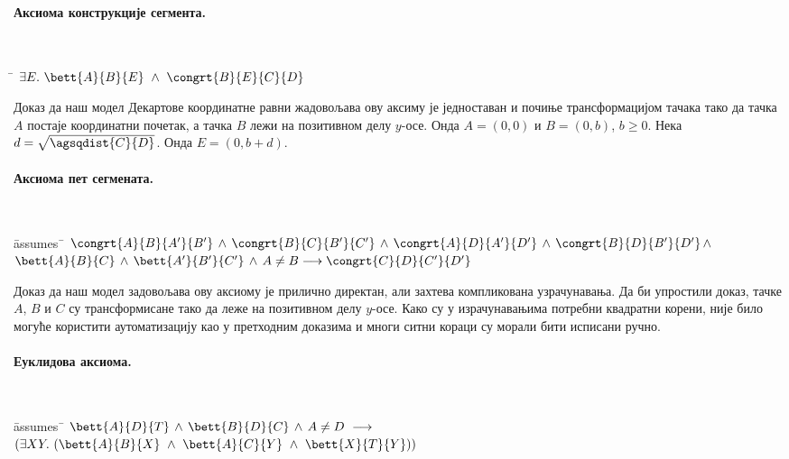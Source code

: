 \begin{center}

\end{center}


\paragraph{Аксиома конструкције сегмента.}
{\tt
\begin{tabbing}
\hspace{5mm}\=\kill
$\exists E.\ \bett{A}{B}{E}\ \wedge\ \congrt{B}{E}{C}{D}$
\end{tabbing}
}

Доказ да наш модел Декартове координатне равни жадовољава ову аксиму
је једноставан и почиње трансформацијом тачака тако да тачка $A$
постаје координатни почетак, а тачка $B$ лежи на позитивном делу
$y$-осе. Онда $A = (0, 0)$ и $B = (0, b)$, $b \ge 0$. Нека $d =
\sqrt{\agsqdist{C}{D}}$. Онда $E = (0, b + d)$.

\paragraph{Аксиома пет сегмената.}
{\tt
\begin{tabbing}
\hspace{5mm}\=assumes\ \=\kill
$\congrt{A}{B}{A'}{B'} \,\wedge\, \congrt{B}{C}{B'}{C'}  \,\wedge\,  \congrt{A}{D}{A'}{D'}  \,\wedge\,  \congrt{B}{D}{B'}{D'} \,\wedge\,$\\
\>$\bett{A}{B}{C} \,\wedge\, \bett{A'}{B'}{C'} \,\wedge\, A \neq B \longrightarrow  \congrt{C}{D}{C'}{D'}$
\end{tabbing}
}

Доказ да наш модел задовољава ову аксиому је прилично директан, али
захтева компликована узрачунавања. Да би упростили доказ, тачке $A$,
$B$ и $C$ су трансформисане тако да леже на позитивном делу
$y$-осе. Како су у израчунавањима потребни квадратни корени, није било
могуће користити аутоматизацију као у претходним доказима и многи
ситни кораци су морали бити исписани ручно.

\paragraph{Еуклидова аксиома.}
{\tt
\begin{tabbing}
\hspace{5mm}\=assumes\ \=\kill
$\bett{A}{D}{T} \,\wedge\, \bett{B}{D}{C} \,\wedge\, A \neq D \ \longrightarrow\ $\\
\>$(\exists X Y.\ (\bett{A}{B}{X}\ \wedge\ \bett{A}{C}{Y}\ \wedge\ \bett{X}{T}{Y}))$
\end{tabbing}
}

